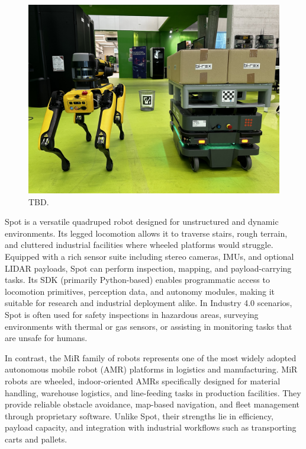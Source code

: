 \documentclass[conference]{IEEEtran}
\begin{document}
\begin{figure}[htb]
    \centering
    \includegraphics[width=1\columnwidth]{images/robots.jpeg}
    \caption{
        TBD.
    }
    \label{fig:robots}
\end{figure}

Spot is a versatile quadruped robot designed for unstructured and dynamic environments. 
%
Its legged locomotion allows it to traverse stairs, rough terrain, 
 and cluttered industrial facilities where wheeled platforms would struggle. 
% 
Equipped with a rich sensor suite including stereo cameras, IMUs, and optional LIDAR payloads, 
 Spot can perform inspection, mapping, and payload-carrying tasks. 
% 
Its SDK (primarily Python-based) enables programmatic access to locomotion primitives, perception data, 
 and autonomy modules, making it suitable for research and industrial deployment alike. 
% 
In Industry 4.0 scenarios, Spot is often used for safety inspections in hazardous areas, 
 surveying environments with thermal or gas sensors, 
 or assisting in monitoring tasks that are unsafe for humans.

In contrast, the MiR family of robots represents one of the most widely adopted 
 autonomous mobile robot (AMR) platforms in logistics and manufacturing.
%
MiR robots are wheeled, indoor-oriented AMRs specifically designed for material handling, warehouse logistics, 
 and line-feeding tasks in production facilities. 
% 
They provide reliable obstacle avoidance, map-based navigation, 
 and fleet management through proprietary software. 
% 
Unlike Spot, their strengths lie in efficiency, payload capacity, and integration 
 with industrial workflows such as transporting carts and pallets.
\end{document}
